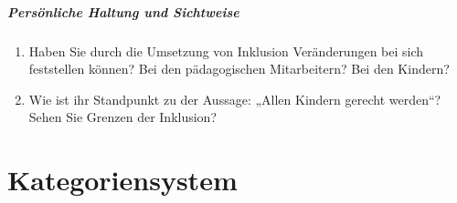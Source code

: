 \paragraph{Persönliche Haltung und Sichtweise}
\begin{enumerate}
\item Haben Sie durch die Umsetzung von Inklusion Veränderungen bei sich feststellen können? Bei den pädagogischen Mitarbeitern? Bei den Kindern? 
\item Wie ist ihr Standpunkt zu der Aussage: „Allen Kindern gerecht werden“? Sehen Sie Grenzen der Inklusion?
\end{enumerate}


\chapter{Kategoriensystem}


